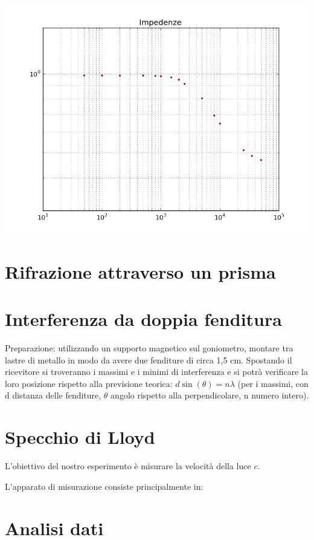 \begin{center}
\includegraphics[scale=0.75]{grafici/C2-2.png} 
\end{center}

\section{Rifrazione attraverso un prisma}

\section{Interferenza da doppia fenditura}
Preparazione: utilizzando un supporto magnetico sul goniometro, montare tra lastre di metallo in modo da avere due
fenditure di circa 1,5 cm. Spostando il ricevitore si troveranno i massimi e i minimi di interferenza e si potrà verificare la
loro posizione rispetto alla previsione teorica: $d \sin(\theta) = n λ$ (per i massimi, con d distanza delle fenditure, $\theta$ angolo
rispetto alla perpendicolare, n numero intero).

\section{Specchio di Lloyd}
L'obiettivo del nostro esperimento è misurare la velocità della luce $c$.

L'apparato di misurazione consiste principalmente in:

\section{Analisi dati}

